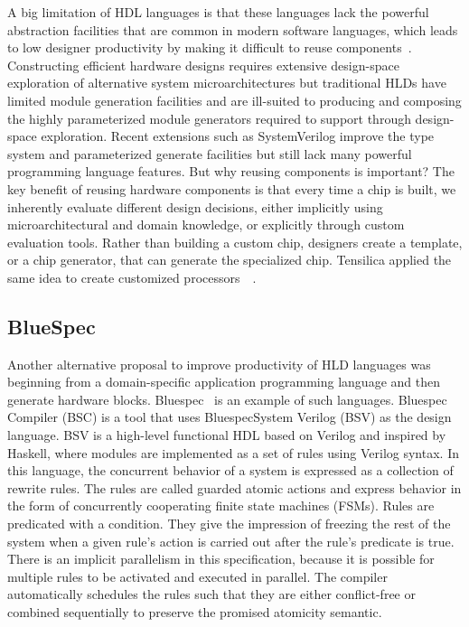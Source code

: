 A big limitation of HDL languages is that these languages lack the powerful abstraction facilities that
are common in modern software languages, which leads to low designer productivity by making it difficult to reuse components~\cite{shacham_rethinking_2010}.
Constructing efficient hardware designs requires extensive design-space exploration of alternative system microarchitectures but traditional HLDs have limited module generation facilities and are ill-suited to producing and composing the highly parameterized module generators required to support through design-space exploration.
Recent extensions such as SystemVerilog improve the type system and parameterized generate facilities but still lack many powerful programming language features.
But why reusing components is important?
The key benefit of reusing hardware components is that every time a chip is built, we inherently evaluate different design decisions, either implicitly using microarchitectural and domain knowledge, or explicitly through custom evaluation tools.
Rather than building a custom chip, designers create a template, or a chip generator, that can generate the specialized chip. Tensilica applied the same idea to create customized processors~\cite{tensillica}~\cite{tensillica}.

\subsection{BlueSpec}

Another alternative proposal to improve productivity of HLD languages was beginning from a domain-specific application programming language and then generate hardware blocks. 
Bluespec~\cite{bluespec} is an example of such languages.
Bluespec Compiler (BSC) is a tool that uses BluespecSystem  Verilog  (BSV)  as  the  design  language.
BSV is a high-level functional HDL based on Verilog and inspired by Haskell, where  modules are implemented as a set of rules using  Verilog  syntax.
In this language, the concurrent behavior of a system is expressed as a collection of rewrite rules.
The rules are called guarded atomic actions and express behavior in the form of concurrently cooperating finite state machines (FSMs).
Rules are predicated with a condition. They give the impression of freezing the rest of the system when a given rule's action is carried out after the rule's predicate is true.
There is an implicit parallelism in this specification, because it is possible for multiple rules to be activated and executed in parallel.
The compiler automatically schedules the rules such that they are either conflict-free or combined sequentially to preserve the promised atomicity semantic.

